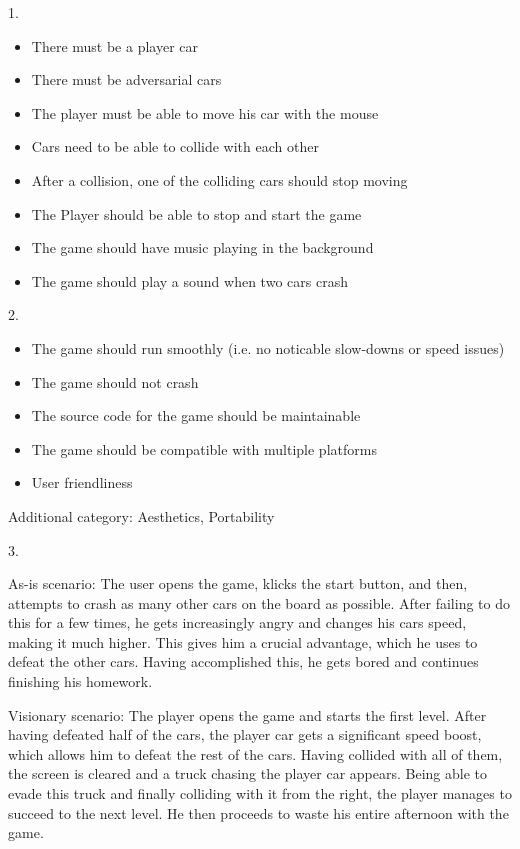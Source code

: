 \documentclass[11pt,a4paper]{article}
\begin{document}
\thispagestyle{empty}
\pagestyle{empty}

1.

\begin{itemize}
\item There must be a player car
\item There must be adversarial cars
\item The player must be able to move his car with the mouse
\item Cars need to be able to collide with each other
\item After a collision, one of the colliding cars should stop moving
\item The Player should be able to stop and start the game
\item The game should have music playing in the background
\item The game should play a sound when two cars crash
\end{itemize}

2.

\begin{itemize}
\item The game should run smoothly (i.e. no noticable slow-downs or speed issues)
\item The game should not crash
\item The source code for the game should be maintainable
\item The game should be compatible with multiple platforms
\item User friendliness
\end{itemize}

Additional category: Aesthetics, Portability

3.

As-is scenario: The user opens the game, klicks the start button, and then,
attempts to crash as many other cars on the board as possible. After failing to
do this for a few times, he gets increasingly angry and changes his cars speed,
making it much higher. This gives him a crucial advantage, which he uses to
defeat the other cars. Having accomplished this, he gets bored and continues
finishing his homework.

\vspace{0.5cm}

Visionary scenario: The player opens the game and starts the first
level. After having defeated half of the cars, the player car gets
a significant speed boost, which allows him to defeat the rest of the
cars. Having collided with all of them, the screen is cleared and a truck
chasing the player car appears. Being able to evade this truck and finally
colliding with it from the right, the player manages to succeed to the
next level. He then proceeds to waste his entire afternoon with the game.
\end{document}
